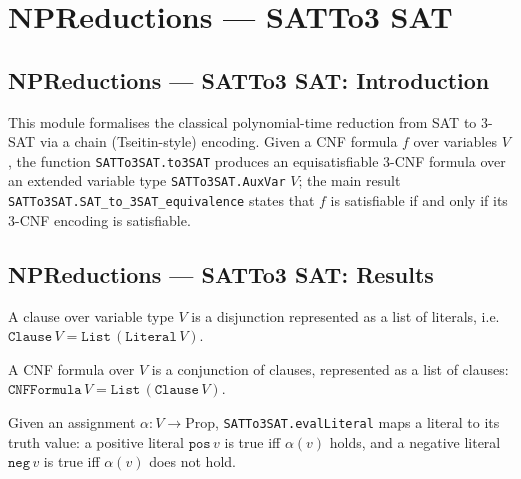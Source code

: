 \section{NPReductions --- SATTo3 SAT}
\subsection*{NPReductions --- SATTo3 SAT: Introduction}

This module formalises the classical polynomial-time reduction from SAT to 3-SAT
via a chain (Tseitin-style) encoding.  Given a CNF formula $f$ over variables $V$,
the function \texttt{SATTo3SAT.to3SAT} produces an equisatisfiable 3-CNF formula over an
extended variable type \texttt{SATTo3SAT.AuxVar} $V$; the main result
\texttt{SATTo3SAT.SAT\_to\_3SAT\_equivalence} states that $f$ is satisfiable if and only if
its 3-CNF encoding is satisfiable.

\subsection*{NPReductions --- SATTo3 SAT: Results}

\begin{definition}[Clause]
\label{SATTo3SAT.Clause}
\leanok
{}
A clause over variable type $V$ is a disjunction represented as a list of literals,
i.e.\ $\mathtt{Clause}\,V = \mathtt{List}\,(\mathtt{Literal}\,V)$.
\end{definition}

\begin{definition}
\label{SATTo3SAT.CNFFormula}
\leanok
{}
A CNF formula over $V$ is a conjunction of clauses, represented as a list of clauses:
$\mathtt{CNFFormula}\,V = \mathtt{List}\,(\mathtt{Clause}\,V)$.
\end{definition}

\begin{definition}
\label{SATTo3SAT.evalLiteral}
\leanok
{}
Given an assignment $\alpha : V \to \mathrm{Prop}$, \texttt{SATTo3SAT.evalLiteral} maps
a literal to its truth value: a positive literal $\mathtt{pos}\,v$ is true iff $\alpha(v)$
holds, and a negative literal $\mathtt{neg}\,v$ is true iff $\alpha(v)$ does not hold.
\end{definition}

